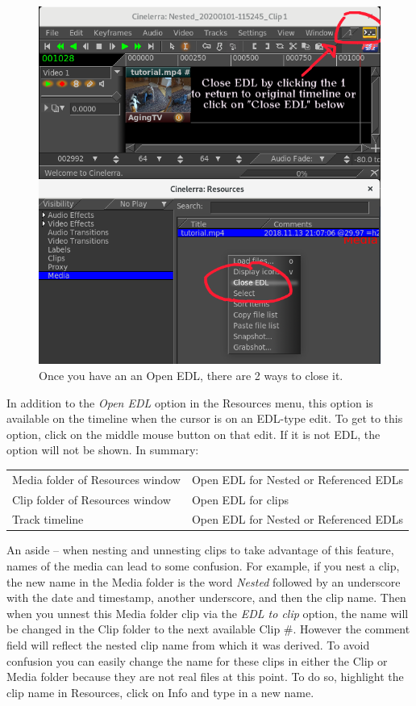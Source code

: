 \pagebreak 
\begin{figure}[h]
    \centering
    \includegraphics[width=0.8\linewidth]{images/editing-img001.png}
    \caption{Once you have an an Open EDL, there are 2 ways to close it.}
    \label{fig:open_edl}
\end{figure}
\relax

In addition to the \textit{Open EDL} option in the Resources menu, this option is available on the timeline when the cursor is on an EDL-type edit. To get to this option, click on the middle mouse button on that edit.  If it is not EDL, the option will not be shown.  In summary:

\begin{center}
    \small
    \begin{tabular}{l l}
        \toprule

	Media folder of Resources window & Open EDL for Nested or Referenced EDLs \\
	Clip folder of Resources window	& Open EDL for clips \\
	Track timeline & Open EDL for Nested or Referenced EDLs \\
        \bottomrule
    \end{tabular}
\end{center}

An aside -- when nesting and unnesting clips to take advantage of this feature, names of the media can lead to some confusion.  For example, if you nest a clip, the new name in the Media folder is the word \textit{Nested} followed by an underscore with the date and timestamp, another underscore, and then the clip name.  Then when you unnest this Media folder clip via the \textit{EDL to clip} option, the name will be changed in the Clip folder to the next available Clip \#.  However the comment field will reflect the nested clip name from which it was derived.  To avoid confusion you can easily change the name for these clips in either the Clip or Media folder because they are not real files at this point. To do so, highlight the clip name in Resources, click on Info and type in a new name.

